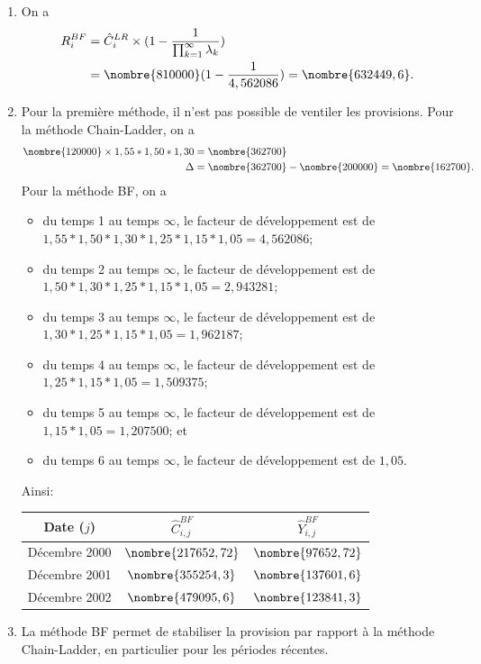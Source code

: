 \begin{exercice}
\begin{sol}
\begin{enumerate}
    \item On a
      \begin{align*}
        R_i^{BF} &= \hat{C}_{i}^{LR} \times ( 1 - \frac{1}{\prod_{k=1}^{\infty} \lambda_k}) \\
                 &= \nombre{810000} (1-\frac{1}{4,562086}) = \nombre{632449,6}.
      \end{align*}
    \item Pour la première méthode, il n'est pas possible de ventiler
      les provisions. Pour la méthode Chain-Ladder, on a
      \begin{align*}
        \nombre{120000} \times 1,55 * 1,50 * 1,30 &= \nombre{362700}\\
        \Delta &= \nombre{362700} - \nombre{200000} = \nombre{162700}.
      \end{align*}
      Pour la méthode BF, on a
      \begin{itemize}
      \item du temps 1 au temps $\infty$, le facteur de développement
        est de $1,55 * 1,50 * 1,30 * 1,25 * 1,15 * 1,05 = 4,562086$;
      \item du temps 2 au temps $\infty$, le facteur de développement
        est de $1,50 * 1,30 * 1,25 * 1,15 * 1,05 = 2,943281$;
      \item du temps 3 au temps $\infty$, le facteur de développement
        est de $1,30 * 1,25 * 1,15 * 1,05 = 1,962187$;
      \item du temps 4 au temps $\infty$, le facteur de développement
        est de $1,25 * 1,15 * 1,05 = 1,509375$;
      \item du temps 5 au temps $\infty$, le facteur de développement
        est de $1,15 * 1,05 = 1,207500$; et
      \item du temps 6 au temps $\infty$, le facteur de développement
        est de $1,05$.
      \end{itemize}
      Ainsi:
      \begin{center}
        \begin{tabular}{|c|c|c|}\hline
          Date ($j$) & $\hat{C}_{i,j}^{BF}$ & $\hat{Y}_{i,j}^{BF}$  \\ \hline
          Décembre 2000 &  $\nombre{217652,72}$ & $\nombre{97652,72}$ \\ \hline
          Décembre 2001 &  $\nombre{355254,3}$ & $\nombre{137601,6}$\\ \hline
          Décembre 2002 &  $\nombre{479095,6}$ & $\nombre{123841,3}$\\ \hline
        \end{tabular}
      \end{center}
    \item La méthode BF permet de stabiliser la provision par rapport à
      la méthode Chain-Ladder, en particulier pour les périodes
      récentes.
    \end{enumerate}
  \end{sol}
\end{exercice}

